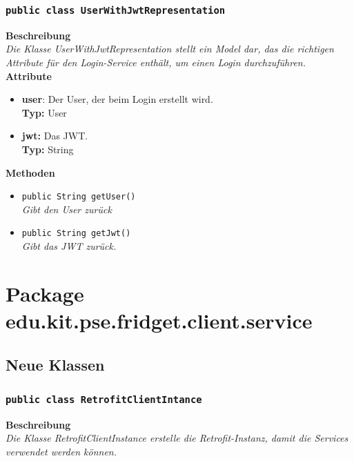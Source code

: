 \documentclass[a4paper]{scrreprt}
\begin{document}
	\subsubsection{\texttt{public class UserWithJwtRepresentation}}
	\textbf{Beschreibung} \\
	\textit{Die Klasse UserWithJwtRepresentation stellt ein Model dar, das die richtigen Attribute für den Login-Service enthält, um einen Login durchzuführen.} \\
	
	\textbf{Attribute}
	\begin{itemize}
		\item \textbf{user}: Der User, der beim Login erstellt wird. \\
		\textbf{Typ:} User
		
		\item \textbf{jwt:} Das JWT. \\
		\textbf{Typ:} String
	\end{itemize}
	
	\textbf{Methoden}
	\begin{itemize}
		\item{\texttt{public String getUser()}}\\
		\textit{Gibt den User zurück}\\
		\item{\texttt{public String getJwt()}}\\
		\textit{Gibt das JWT zurück.}\\
	\end{itemize}
	
	\section{Package edu.kit.pse.fridget.client.service}
	\subsection{Neue Klassen}
	\subsubsection{\texttt{public class RetrofitClientIntance}}
	\textbf{Beschreibung} \\
	\textit{Die Klasse RetrofitClientInstance erstelle die Retrofit-Instanz, damit die Services verwendet werden können.} \\
	
\end{document}
